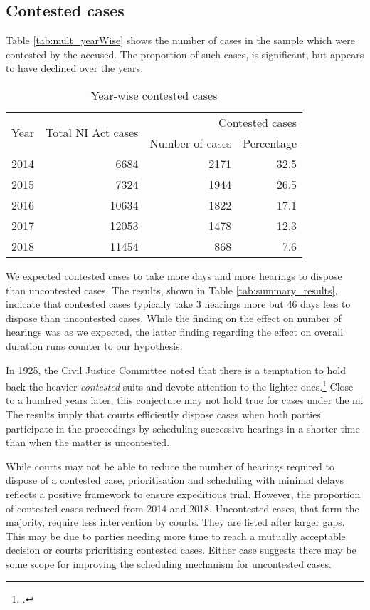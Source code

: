 \subsection{Contested cases}
\label{sec:contested-cases}

Table \ref{tab:mult_yearWise} shows the number of cases in the sample which were contested by the accused. The proportion of such cases, is significant, but appears to have declined over the years. %

\begin{longtable}[h!]{@{}lrrr@{}}
  \caption{Year-wise contested cases}\label{tab:cont_yearWise}\\
\toprule
\multirow{2}{*}{Year} &  \multirow{2}{*}{Total NI Act cases} & \multicolumn{2}{p{4cm}}{Contested cases}\\
\cmidrule{3-4}
&& Number of cases & Percentage \\
\midrule\endhead
2014 &   6684 &  2171 &  32.5 \\
2015 &   7324 &  1944 &  26.5 \\
2016 &  10634 &  1822 &  17.1 \\
2017 &  12053 &  1478 &  12.3 \\
2018 &  11454 &   868 &   7.6 \\
\bottomrule
\end{longtable}

We expected contested cases to take more days and more hearings to dispose than uncontested cases. The results, shown in Table \ref{tab:summary_results}, indicate that contested cases typically take 3 hearings more but 46 days less to dispose than uncontested cases. While the finding on the effect on number of hearings was as we expected, the latter finding regarding the effect on overall duration runs counter to our hypothesis.

In 1925, the Civil Justice Committee noted that there is a temptation to hold back the heavier \textit{contested} suits and devote attention to the lighter ones.\footcite{cg1925_civiljustice} Close to a hundred years later, this conjecture may not hold true for cases under the \gls{ni}. The results imply that courts efficiently dispose cases when both parties participate in the proceedings by scheduling successive hearings in a shorter time than when the matter is uncontested.

While courts may not be able to reduce the number of hearings required to dispose of a contested case, prioritisation and scheduling with minimal delays reflects a positive framework to ensure expeditious trial. However, the proportion of contested cases reduced from 2014 and 2018. Uncontested cases, that form the majority, require less intervention by courts. They are listed after larger gaps. This may be due to parties needing more time to reach a mutually acceptable decision or courts prioritising contested cases. Either case suggests there may be some scope for improving the scheduling mechanism for uncontested cases.

